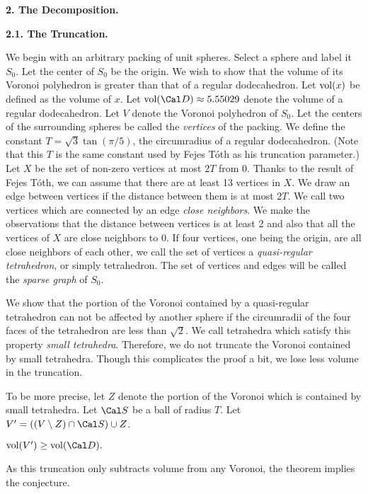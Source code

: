 \bigskip

\centerline {{ \bf 2. The Decomposition.}}

\bigskip

{\bf 2.1. The Truncation.}

We begin with an arbitrary packing of unit spheres.  Select a sphere and label it $S_0$.
  Let the center of $S_0$ be the origin.  We wish to show that the volume of its Voronoi 
polyhedron is greater than that of a regular dodecahedron.  
Let $\operatorname{vol}(x)$ be defined as the volume of $x$.  Let $\vol(\Cal D)\approx 5.55029$
 denote the volume of a regular dodecahedron.
Let $V$ denote the Voronoi polyhedron of $S_0$.
Let the centers of the surrounding spheres be called the {\it vertices} of the packing.
We define the constant $T=\sqrt 3 \tan(\pi/5)$, the circumradius of a regular dodecahedron.
(Note that this $T$ is the same constant used by Fejes T\'oth as his truncation parameter.)
Let $X$ be the set of non-zero vertices at most $2T$ from $0$.
Thanks to the result of Fejes T\'oth, we can assume that there are at least 13 vertices in $X$. 
 We draw an edge between vertices if the distance between them is at most $2T$. 
 We call two vertices which are connected by an edge {\it close neighbors}. 
 We make the observations that the distance between vertices is at least 2 and 
 also that all the vertices of $X$ are close neighbors to $0$.
  If four vertices, one being the origin, are all close neighbors of each other, we call the set of vertices a {\it quasi-regular tetrahedron}, or simply tetrahedron.  
The set of vertices and edges will be called the {\it sparse graph} of $S_0$.

We show that the 
portion of the Voronoi contained by a quasi-regular tetrahedron can not be
affected by another sphere if the circumradii of the four faces of the tetrahedron are 
less than $\sqrt2$.  We call tetrahedra which satisfy this property {\it small tetrahedra}.
Therefore, we do not truncate the Voronoi contained by small tetrahedra.
Though this complicates the proof a bit, we lose less volume in the truncation.

To be more precise,
let $Z$ denote the portion of the Voronoi which is contained by small tetrahedra.
 Let $\Cal S$ be a ball of radius $T$.
Let $V'=((V\setminus Z)\cap \Cal S)\cup Z$.  

 $\vol(V') \ge \vol(\Cal D).$ \endproclaim

As this truncation only subtracts volume from any Voronoi, the theorem implies the conjecture.


